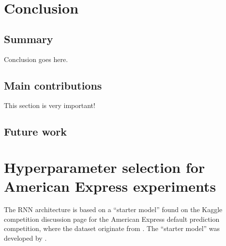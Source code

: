 \documentclass{statsmsc}
\begin{document}
{%

\chapter{Conclusion} %

\section{Summary}%
\label{sec:Summary}


Conclusion goes here.



\section{Main contributions}%
\label{sec:Main contributions}

This section is very important!


\section{Future work}%
\label{sec:Future work}


\clearpage
\renewcommand*{\thepage}{A\arabic{page}}

\appendix

\chapter{Hyperparameter selection for American Express experiments}
\label{ch:hyp_amex}

The \ac{RNN} architecture is based on a ``starter model'' found on the Kaggle competition
discussion page for the American Express default prediction competition, where the dataset
originate from \cite{amex-data}. The ``starter model'' was developed by \cite{amex-starter}.

}
\end{document}
